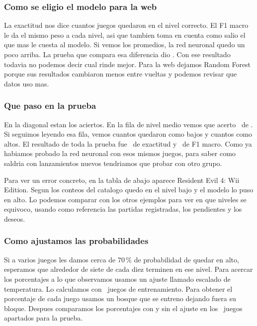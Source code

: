\subsubsection{Como se eligio el modelo para la web}
\ComparacionModelos

La exactitud nos dice cuantos juegos quedaron en el nivel correcto. El F1 macro le da el mismo peso a cada nivel, asi que tambien toma en cuenta como salio el que mas le cuesta al modelo. Si vemos los promedios, la red neuronal quedo un poco arriba. La prueba que compara esa diferencia dio \PComparacion. Con ese resultado todavia no podemos decir cual rinde mejor. Para la web dejamos Random Forest porque sus resultados cambiaron menos entre vueltas y podemos revisar que datos uso mas.

\subsubsection{Que paso en la prueba}
\MatrizConfusion

En la diagonal estan los aciertos. En la fila de nivel medio vemos que acerto \AciertosMedio\ de \TotalMedio. Si seguimos leyendo esa fila, vemos cuantos quedaron como bajos y cuantos como altos. El resultado de toda la prueba fue \ExactitudPrueba\ de exactitud y \FPrueba\ de F1 macro. Como ya habiamos probado la red neuronal con esos mismos juegos, para saber como saldria con lanzamientos nuevos tendriamos que probar con otro grupo.

Para ver un error concreto, en la tabla de abajo aparece Resident Evil 4: Wii Edition. Segun los conteos del catalogo quedo en el nivel bajo y el modelo lo puso en alto. Lo podemos comparar con los otros ejemplos para ver en que niveles se equivoco, usando como referencia las partidas registradas, los pendientes y los deseos.

\EjemplosError

\subsubsection{Como ajustamos las probabilidades}
Si a varios juegos les damos cerca de 70\,\% de probabilidad de quedar en alto, esperamos que alrededor de siete de cada diez terminen en ese nivel. Para acercar los porcentajes a lo que observamos usamos un ajuste llamado escalado de temperatura. Lo calculamos con \JuegosCalibracion\ juegos de entrenamiento. Para obtener el porcentaje de cada juego usamos un bosque que se entreno dejando fuera su bloque. Despues comparamos los porcentajes con y sin el ajuste en los \JuegosPrueba\ juegos apartados para la prueba.

